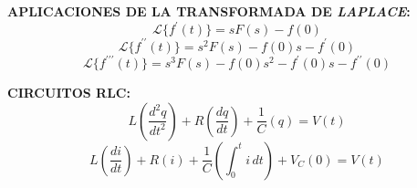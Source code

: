 \documentclass[letter,twoside,8pt]{article}
\begin{document}
\textbf{APLICACIONES DE LA TRANSFORMADA DE \emph{LAPLACE}:}
\begin{equation*}
    \mathcal{L}\{f^{\prime}(t)\}=sF(s)-f(0)
\end{equation*}
\begin{equation*}
    \mathcal{L}\{f^{\prime\prime}(t)\}=s^2F(s)-f(0)s-f^{\prime}(0)
\end{equation*}
\begin{equation*}
    \mathcal{L}\{f^{\prime\prime\prime}(t)\}=s^3F(s)-f(0)s^2-f^{\prime}(0)s-f^{\prime\prime}(0)
\end{equation*}

\textbf{CIRCUITOS RLC:}
\begin{equation*}
    L\left(\frac{d^{2}q}{dt^2}\right)+R\left(\frac{dq}{dt}\right)+\frac{1}{C}(q)=V(t)
\end{equation*}
\begin{equation*}
    L\left(\frac{di}{dt}\right)+R(i)+\frac{1}{C}\left(\int_0^{t}{i}\,dt\right)+V_C(0)=V(t)
\end{equation*}
\end{document}
